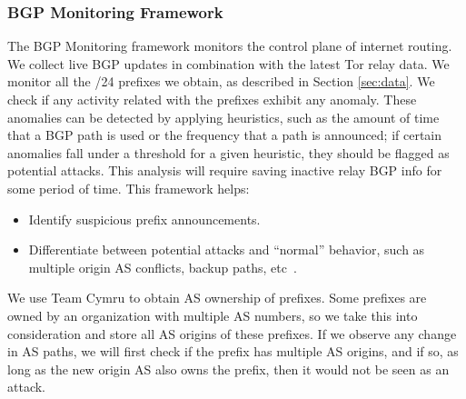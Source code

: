 
\subsubsection{BGP Monitoring Framework} 
\label{sec:bgp}
The BGP Monitoring framework monitors the control plane of internet routing. We collect live BGP updates in combination with the latest Tor relay data. We monitor all the /24 prefixes we obtain, as described in Section \ref{sec:data}. We check if any activity related with the prefixes exhibit any anomaly. These anomalies can be detected by applying heuristics, such as the amount of time that a BGP path is used or the frequency that a path is announced; if certain anomalies fall under a threshold for a given heuristic, they should be flagged as potential attacks. This analysis will require saving inactive relay BGP info for some period of time.  This framework helps:

\begin{itemize}
\item Identify suspicious prefix announcements.
\item Differentiate between potential attacks and ``normal'' behavior, such as multiple origin AS conflicts, backup paths, etc~\cite{zhao2001analysis}.
\end{itemize}

We use Team Cymru \cite{teamcymru} to obtain AS ownership of prefixes. Some prefixes are owned by an organization with multiple AS numbers, so we take this into consideration and store all AS origins of these prefixes. If we observe any change in AS paths, we will first check if the prefix has multiple AS origins, and if so, as long as the new origin AS also owns the prefix, then it would not be seen as an attack. 

